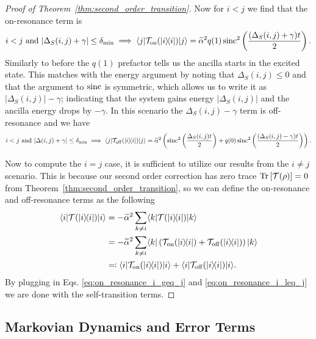 \begin{proof}[Proof of Theorem~\ref{thm:second_order_transition}]
    Now for $i < j$ we find that the on-resonance term is 
    \begin{equation}
    i < j \text{ and } |\Delta_S(i,j) + \gamma| \le \delta_{\min} \implies \langle j| \mathcal{T}_{\rm on}(| i\rangle\! \langle i|) |j\rangle = \widetilde{\alpha}^2 q(1) \operatorname{sinc}^2 \left( \frac{(\Delta_S(i,j) + \gamma)t}{2} \right). \label{eq:on_resonance_i_leq_j}
    \end{equation}
    Similarly to before the $q(1)$ prefactor tells us the ancilla starts in the excited state. This matches with the energy argument by noting that $\Delta_S(i,j) \le 0$ and that the argument to $\operatorname{sinc}$ is symmetric, which allows us to write it as $|\Delta_S(i,j)| - \gamma$; indicating that the system gains energy $|\Delta_S(i,j)|$ and the ancilla energy drops by $-\gamma$. In this scenario the $\Delta_S(i,j) - \gamma$ term is off-resonance and we have
    \begin{align}
        i < j \text{ and } |\Delta(i,j) + \gamma| \le \delta_{\min} \implies  \langle j| \mathcal{T}_{\rm off}(| i\rangle\! \langle i|) |j\rangle = \widetilde{\alpha}^2\left( \operatorname{sinc}^2 \left( \frac{\Delta_S(i,j) t}{2} \right) + q(0) \operatorname{sinc}^2 \left(\frac{(\Delta_S(i,j) - \gamma) t}{2} \right) \right).
    \end{align}


    Now to compute the $i = j$ case, it is sufficient to utilize our results from the $i \neq j$ scenario. This is because our second order correction has zero trace $\operatorname{Tr} \left[  \mathcal{T}(\rho)  \right] = 0$ from Theorem~\ref{thm:second_order_transition}, so we can define the on-resonance and off-resonance terms as the following
    \begin{align}
        \langle i| \mathcal{T}(| i\rangle\! \langle i|) |i\rangle &= - \widetilde{\alpha}^2 \sum_{k \neq i} \langle k| \mathcal{T}(| i\rangle\! \langle i|) |k\rangle \\
        &= - \widetilde{\alpha}^2 \sum_{k \neq i} \langle k| \left( \mathcal{T}_{\rm on}(| i\rangle\! \langle i|) + \mathcal{T}_{\rm off}(| i\rangle\! \langle i|) \right) |k\rangle \\
        &\eqqcolon  \langle i| \mathcal{T}_{\rm on}(| i\rangle\! \langle i|) |i\rangle + \langle i| \mathcal{T}_{\rm off}(| i\rangle\! \langle i|) |i\rangle.
    \end{align}
    By plugging in Eqs. \eqref{eq:on_resonance_i_geq_j} and \eqref{eq:on_resonance_i_leq_j} we are done with the self-transition terms. 
\end{proof}



\subsection{Markovian Dynamics and Error Terms} \label{sec:markov}

